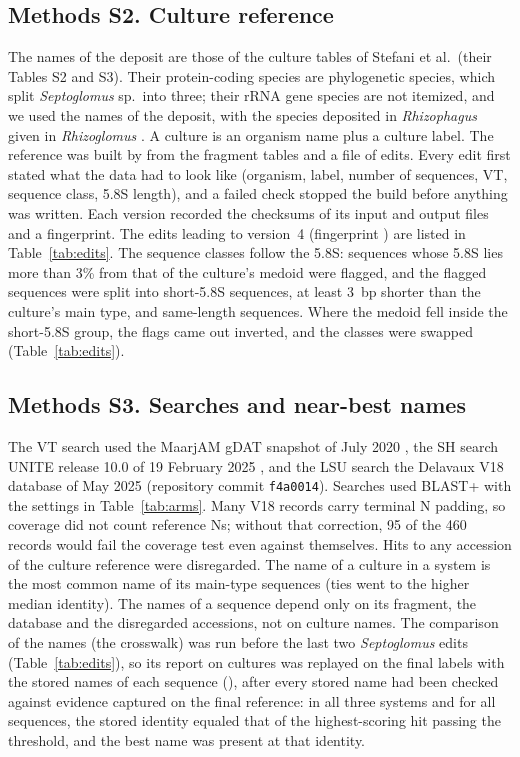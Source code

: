 \documentclass[11pt]{article}
\newcommand{\spn}[1]{\emph{#1}}   %
\begin{document}
\subsection*{Methods S2. Culture reference}
The names of the deposit are those of the culture tables of Stefani et al.\ (their Tables S2 and S3). Their
\StefaniPCSpecies{} protein-coding species are phylogenetic species, which split \spn{Septoglomus} sp.\ into three;
their \StefaniSpecies{} rRNA gene species are not itemized, and we used the names of the deposit, with the species
deposited in \spn{Rhizophagus} given in \spn{Rhizoglomus} \cite{sieverding2015rhizoglomus}. A culture is an organism
name plus a culture label. The reference was built by  from the fragment tables and a file of
edits. Every edit first stated what the data had to look like (organism, label, number of sequences, VT, sequence
class, 5.8S length), and a failed check stopped the build before anything was written. Each version recorded the
checksums of its input and output files and a fingerprint. The edits leading to version~4 (fingerprint
\RefFingerprint) are listed in Table~\ref{tab:edits}. The sequence classes follow the 5.8S: sequences whose 5.8S lies
more than 3\% from that of the culture's medoid were flagged, and the flagged sequences were split into short-5.8S
sequences, at least 3~bp shorter than the culture's main type, and same-length sequences. Where the medoid fell inside
the short-5.8S group, the flags came out inverted, and the classes were swapped (Table~\ref{tab:edits}).

\subsection*{Methods S3. Searches and near-best names}
The VT search used the MaarjAM gDAT snapshot of July 2020 \cite{opik2010maarjam}, the SH search UNITE release 10.0 of
19 February 2025 \cite{nilsson2019unite,unite2025release}, and the LSU search the Delavaux V18 database of May 2025
\cite{delavaux2021lsu,delavaux2022lsu,delavaux2024lsu} (repository commit \texttt{f4a0014}). Searches used BLAST+
\cite{camacho2009blast} with the settings in Table~\ref{tab:arms}. Many V18 records carry terminal N padding, so
coverage did not count reference Ns; without that correction, 95 of the 460 records would fail the coverage test even
against themselves. Hits to any accession of the culture reference were disregarded. The name of a culture in a
system is the most common name of its main-type sequences (ties went to the higher median identity). The names of a
sequence depend only on its fragment, the database and the disregarded accessions, not on culture names. The
comparison of the names (the crosswalk) was run before the last two \spn{Septoglomus} edits (Table~\ref{tab:edits}),
so its report on cultures was replayed on the final labels with the stored names of each sequence
(), after every stored name had been checked against evidence captured on the final
reference: in all three systems and for all \NCopiesRetained{} sequences, the stored identity equaled that of the
highest-scoring hit passing the threshold, and the best name was present at that identity.
\end{document}

